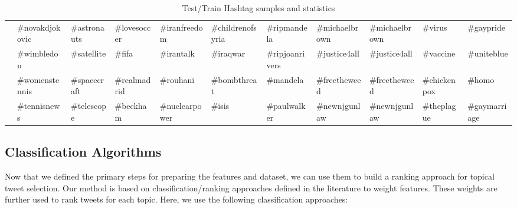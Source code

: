 \begin{table*}[tbh!]
{{\begin{tabular}{|l|l|l|l|l|l|l|l|l|l|l|}
                                          & \#novakdjokovic                      & \#astronauts                        & \#lovesoccer                         & \#iranfreedom                          & \#childrenofsyria                           & \#ripmandela                                 & \#michaelbrown                             & \#michaelbrown                                & \#virus                                 & \#gaypride                         \\ \cline{2-11} 
                                          & \#wimbledon                          & \#satellite                         & \#fifa                               & \#irantalk                             & \#iraqwar                                   & \#ripjoanrivers                              & \#justice4all                              & \#justice4all                                 & \#vaccine                               & \#uniteblue                        \\ \cline{2-11} 
                                          & \#womenstennis                       & \#spacecraft                        & \#realmadrid                         & \#rouhani                              & \#bombthreat                                & \#mandela                                    & \#freetheweed                              & \#freetheweed                                 & \#chickenpox                            & \#homo                             \\ \cline{2-11} 
                                          & \#tennisnews                         & \#telescope                         & \#beckham                            & \#nuclearpower                         & \#isis                                      & \#paulwalker                                 & \#newnjgunlaw                              & \#newnjgunlaw                                 & \#theplague                             & \#gaymarriage                      \\ \hline
\end{tabular}
}
}
\caption{Test/Train Hashtag samples and statistics}
\label{table:sampleHashtags}
\end{table*}

\subsection{Classification Algorithms}
Now that we defined the primary steps for preparing the features and dataset, we can use them to build a ranking approach for topical tweet selection. Our method is based on classification/ranking approaches defined in the literature to weight features. These weights are further used to rank tweets for each topic. Here, we use the following classification approaches:

